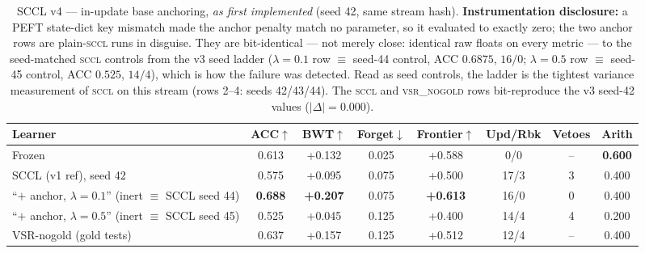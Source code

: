 \documentclass[10pt,conference]{IEEEtran}
\begin{document}
\begin{table}[htbp]
\centering
\caption{SCCL v4 --- in-update base anchoring, \emph{as first implemented} (seed 42, same stream hash). \textbf{Instrumentation disclosure:} a PEFT state-dict key mismatch made the anchor penalty match no parameter, so it evaluated to exactly zero; the two anchor rows are plain-\textsc{sccl} runs in disguise. They are bit-identical --- not merely close: identical raw floats on every metric --- to the seed-matched \textsc{sccl} controls from the v3 seed ladder ($\lambda{=}0.1$ row $\equiv$ seed-44 control, ACC $0.6875$, $16/0$; $\lambda{=}0.5$ row $\equiv$ seed-45 control, ACC $0.525$, $14/4$), which is how the failure was detected. Read as seed controls, the ladder is the tightest variance measurement of \textsc{sccl} on this stream (rows 2--4: seeds 42/43/44). The \textsc{sccl} and \textsc{vsr\_nogold} rows bit-reproduce the v3 seed-42 values ($|\Delta|=0.000$).}
\label{tab:v4}
\begin{tabular}{lccccccc}
\toprule
Learner & ACC$\uparrow$ & BWT$\uparrow$ & Forget$\downarrow$ & Frontier$\uparrow$ & Upd/Rbk & Vetoes & Arith \\
\midrule
Frozen                & 0.613 & +0.132 & 0.025 & +0.588 & 0/0 & -- & \textbf{0.600} \\
SCCL (v1 ref), seed 42         & 0.575 & +0.095 & 0.075 & +0.500 & 17/3 & 3 & 0.400 \\
``$+$ anchor, $\lambda{=}0.1$'' (inert $\equiv$ SCCL seed 44) & \textbf{0.688} & \textbf{+0.207} & 0.075 & \textbf{+0.613} & 16/0 & 0 & 0.400 \\
``$+$ anchor, $\lambda{=}0.5$'' (inert $\equiv$ SCCL seed 45) & 0.525 & +0.045 & 0.125 & +0.400 & 14/4 & 4 & 0.200 \\
VSR-nogold (gold tests) & 0.637 & +0.157 & 0.125 & +0.512 & 12/4 & -- & 0.400 \\
\bottomrule
\end{tabular}
\end{table}
\end{document}
